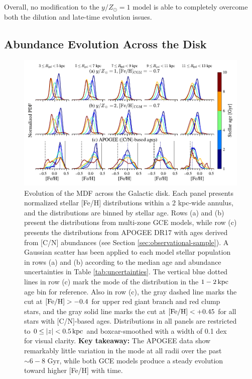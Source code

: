 \documentclass[twocolumn,twocolappendix,linenumbers]{aastex631}
\newcommand{\mathFeH}{{\rm [Fe/H]}}
\newcommand{\yZ}[1]{$y/Z_\odot=#1$}
\begin{document}
Overall, no modification to the \yZ{1} model is able to completely overcome both the dilution and late-time evolution issues.

\subsection{Abundance Evolution Across the Disk}
\label{sec:disk-evolution}

\begin{figure}
    \centering
    \includegraphics[width=0.9\linewidth]{figures/mdf_evolution.pdf}
    \caption{Evolution of the MDF across the Galactic disk. Each panel presents normalized stellar [Fe/H] distributions within a {2 kpc}-wide annulus, and the distributions are binned by stellar age. Rows (a) and (b) present the distributions from multi-zone GCE models, while row (c) presents the distributions from APOGEE DR17 with ages derived from [C/N] abundances (see Section \ref{sec:observational-sample}). A Gaussian scatter has been applied to each model stellar population in rows (a) and (b) according to the median age and abundance uncertainties in Table \ref{tab:uncertainties}. The vertical blue dotted lines in row (c) mark the mode of the distribution in the $1-2\,{\rm kpc}$ age bin for reference. Also in row (c), the gray dashed line marks the cut at $\mathFeH>-0.4$ for upper red giant branch and red clump stars, and the gray solid line marks the cut at $\mathFeH<+0.45$ for all stars with [C/N]-based ages. Distributions in all panels are restricted to $0\leq|z|<0.5\,{\rm kpc}$ and boxcar-smoothed with a width of {0.1 dex} for visual clarity. {\bf Key takeaway:} The APOGEE data show remarkably little variation in the mode at all radii over the past $\sim6-8$ Gyr, while both GCE models produce a steady evolution toward higher [Fe/H] with time.}
    \label{fig:mdf-evolution}
\end{figure}
\end{document}
